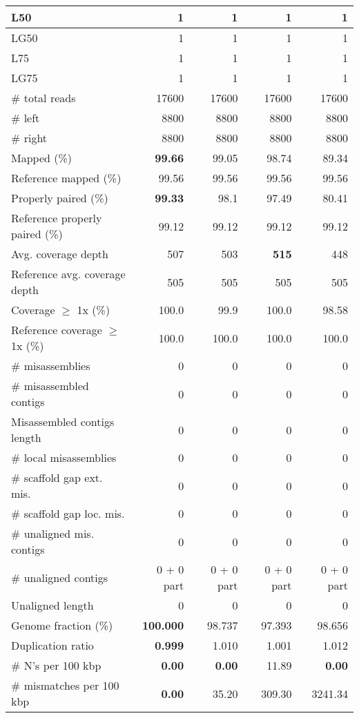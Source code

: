 \documentclass[12pt,a4paper]{article}
\begin{document}
\begin{table}[ht]
\begin{center}
\begin{tabular}{|l*{4}{|r}|}
L50 & 1 & 1 & 1 & 1 \\ \hline
LG50 & 1 & 1 & 1 & 1 \\ \hline
L75 & 1 & 1 & 1 & 1 \\ \hline
LG75 & 1 & 1 & 1 & 1 \\ \hline
\# total reads & 17600 & 17600 & 17600 & 17600 \\ \hline
\# left & 8800 & 8800 & 8800 & 8800 \\ \hline
\# right & 8800 & 8800 & 8800 & 8800 \\ \hline
Mapped (\%) & {\bf 99.66} & 99.05 & 98.74 & 89.34 \\ \hline
Reference mapped (\%) & 99.56 & 99.56 & 99.56 & 99.56 \\ \hline
Properly paired (\%) & {\bf 99.33} & 98.1 & 97.49 & 80.41 \\ \hline
Reference properly paired (\%) & 99.12 & 99.12 & 99.12 & 99.12 \\ \hline
Avg. coverage depth & 507 & 503 & {\bf 515} & 448 \\ \hline
Reference avg. coverage depth & 505 & 505 & 505 & 505 \\ \hline
Coverage $\geq$ 1x (\%) & 100.0 & 99.9 & 100.0 & 98.58 \\ \hline
Reference coverage $\geq$ 1x (\%) & 100.0 & 100.0 & 100.0 & 100.0 \\ \hline
\# misassemblies & 0 & 0 & 0 & 0 \\ \hline
\# misassembled contigs & 0 & 0 & 0 & 0 \\ \hline
Misassembled contigs length & 0 & 0 & 0 & 0 \\ \hline
\# local misassemblies & 0 & 0 & 0 & 0 \\ \hline
\# scaffold gap ext. mis. & 0 & 0 & 0 & 0 \\ \hline
\# scaffold gap loc. mis. & 0 & 0 & 0 & 0 \\ \hline
\# unaligned mis. contigs & 0 & 0 & 0 & 0 \\ \hline
\# unaligned contigs & 0 + 0 part & 0 + 0 part & 0 + 0 part & 0 + 0 part \\ \hline
Unaligned length & 0 & 0 & 0 & 0 \\ \hline
Genome fraction (\%) & {\bf 100.000} & 98.737 & 97.393 & 98.656 \\ \hline
Duplication ratio & {\bf 0.999} & 1.010 & 1.001 & 1.012 \\ \hline
\# N's per 100 kbp & {\bf 0.00} & {\bf 0.00} & 11.89 & {\bf 0.00} \\ \hline
\# mismatches per 100 kbp & {\bf 0.00} & 35.20 & 309.30 & 3241.34 \\ \hline

\end{tabular}
\end{center}
\end{table}
\end{document}
